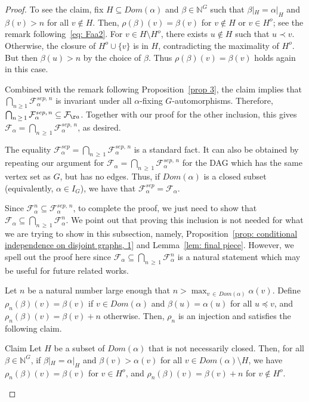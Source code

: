 \documentclass[10pt]{amsart}
\theoremstyle{definition}\newtheorem{defi}[theo]{Definition}\newtheorem{rema}[theo]{Remark}\newtheorem{exam}[theo]{Example}\newtheorem{exem}[theo]{Example}\newtheorem{nota}[theo]{Notation}
\newcommand{\alf}{\alpha}%
\newcommand*\bb{\beta}
\newcommand*{\sep}{\mathit{sep}}
\newcommand{\indices}[1]{\mathbb{N}^{#1}}
\newcommand*\dom{\mathit{Dom}}
\newcommand*\N{\mathbb{N}}
\newcommand*\FF{\mathcal{F}}
\begin{document}
\begin{proof}
To see the claim, fix $H \subseteq \dom(\alf)$ and $\bb \in \N^G$ such that $\bb|_H=\alf|_H$ and $\bb(v)>n$ for all $v \not\in H$. Then, $\rho(\bb)(v)=\bb(v)$ for $v \not\in H$ or $v \in H^o$; see the remark following~\eqref{eq: Faa2}. For $v \in H\setminus H^o$, there exists $u \notin H$ such that $u \prec v$. Otherwise, the closure of $H^o \cup \{v\}$ is in $H$, contradicting the maximality of $H^o$. But then $\bb(u) > n$ by the choice of $\bb$. Thus $\rho(\bb)(v)=\bb(v)$ holds again in this case.

Combined with the remark following Proposition~\ref{prop 3}, the claim implies that $\bigcap_{n \geq 1} \mathcal{F}^{\sep,\,n}_\alf$ is invariant under all $\alf$-fixing $G$-automorphisms. Therefore, $\bigcap_{n \,\geq\,1} \mathcal{F}^{\sep,\,n}_\alf\linebreak\subseteq \FF_{å}$. Together with our proof for the other inclusion, this gives $\FF_\alf = \bigcap_{n\,\geq\,1} \mathcal{F}^{\sep,\,n}_\alf$, as desired.

The equality $\FF_\alf^{\sep}=\bigcap_{n\,\geq\,1} \mathcal{F}^{\sep,\,n}_\alf$ is a standard fact. It can also be obtained by repeating our argument for $\FF_\alf =\bigcap_{n\,\geq\,1} \mathcal{F}^{\sep,\,n}_\alf$ {for the DAG which has the same vertex set as $G$, but has no edges}. Thus, if $\dom(\alf)$ is a closed subset (equivalently, $\alf\in I_G$), we have that $\FF_\alf^{\sep}=\FF_\alf $.

Since $\FF_\alf^n \subseteq \mathcal{F}_\alf^{\sep,\,n}$, to complete the proof, we just need to show that $\FF_\alf \subseteq \bigcap_{n\,\geq\,1} \FF_\alf^n $. We point out that proving this inclusion is not needed for what we are trying to show in this subsection, namely, Proposition~\ref{prop: conditional independence on disjoint graphs, 1} and Lemma~\ref{lem: final piece}. However, we spell out the proof here since $\FF_\alf \subseteq \bigcap_{n\,\geq\,1} \FF_\alf^n $ is a natural statement which may be useful for future related works.

Let $n$ be a natural number large enough that $n > \max_{v\,\in\,\dom(\alf)}\alf(v)$. Define $\rho_n(\bb)(v)=\bb(v)$ if $v \in \dom(\alf)$ and $\bb(u)=\alf(u)$ for all $u \preceq v$, and $\rho_n(\bb)(v)=\bb(v)+n$ otherwise. Then, $\rho_n$ is an injection and satisfies the following claim.
\begin{enonce*}[plain]{Claim}
Let $H$ be a subset of $\dom(\alf)$ that is not necessarily closed. Then, for all $\bb \in \indices G$, if $\bb|_H=\alf|_H$ and $\bb(v) > \alf(v)$ for all $v \in \dom(\alf) \setminus H$, we have $\rho_n(\bb)(v)=\bb(v)$ for $v \in H^o$, and $\rho_n(\bb)(v)=\bb(v)+n$ for $v \not\in H^o$.
\end{enonce*}


\end{proof}
\end{document}
